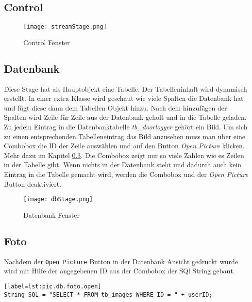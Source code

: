 \subsection{Control}
\label{subsec.control}

\begin{figure}[h]
  \begin{center}
    \texttt{[image: streamStage.png]}
  		  \caption{Control Fenster}
     \label{fig.StreamFenster}
  \end{center}
\end{figure}

\subsection{Datenbank}
\label{subsec.datenbank}
Diese Stage hat als Hauptobjekt eine Tabelle. Der Tabelleninhalt wird dynamisch erstellt. In einer extra Klasse wird geschaut wie viele Spalten die Datenbank hat und fügt diese dann dem Tabellen Objekt hinzu. Nach dem hinzufügen der Spalten wird Zeile für Zeile aus der Datenbank geholt und in die Tabelle geladen. Zu jedem Eintrag in die Datenbanktabelle \textit{tb\_doorlogger} gehört ein Bild. Um sich zu einen entsprechenden Tabelleneintrag das Bild anzusehen muss man über eine Combobox die ID der Zeile auswählen und auf den Button \textit{Open Picture} klicken. Mehr dazu im Kapitel \ref{subsec.foto}. Die Combobox zeigt nur so viele Zahlen wie es Zeilen in der Tabelle gibt. Wenn nichts in der Datenbank steht und dadurch auch kein Eintrag in die Tabelle gemacht wird, werden die Combobox und der \textit{Open Picture} Button deaktiviert.

\begin{figure}[h]
  \begin{center}
    \texttt{[image: dbStage.png]}
  		  \caption{Datenbank Fenster}
     \label{fig.DatenbankFenster}
  \end{center}
\end{figure}

\subsection{Foto}
\label{subsec.foto}
Nachdem der \texttt{Open Picture} Button in der Datenbank Ansicht gedruckt wurde wird mit Hilfe der angegebenen ID aus der Combobox der SQl String gebaut.

\begin{lstlisting}[caption={Java-SQL String Foto öffnen},captionpos=b][label=lst:pic.db.foto.open]
String SQL = "SELECT * FROM tb_images WHERE ID = " + userID;
\end{lstlisting}

